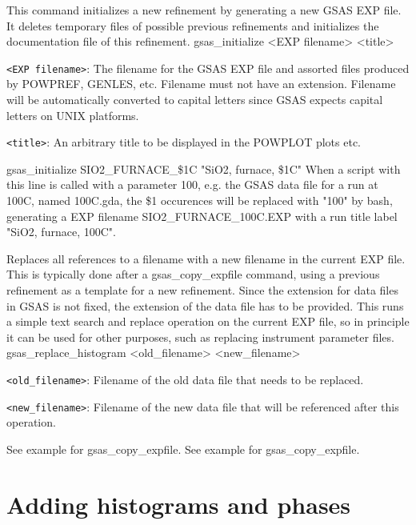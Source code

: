 {
This command initializes a new refinement by generating a new GSAS EXP file. It deletes temporary files of possible previous refinements and initializes the documentation file of this refinement.
}{
gsas\_initialize <EXP filename> <title>
}{
\item \texttt{<EXP filename>}: The filename for the GSAS EXP file and assorted files produced by POWPREF, GENLES, etc. Filename must not have an extension. Filename will be automatically converted to capital letters since GSAS expects capital letters on UNIX platforms.
\item \texttt{<title>}: An arbitrary title to be displayed in the POWPLOT plots etc.
}{
gsas\_initialize SIO2\_FURNACE\_\$1C "SiO2, furnace, \$1C"
}{
When a script with this line is called with a parameter 100, e.g. the GSAS data file for a run at  100C, 
named 100C.gda, the \$1 occurences will be replaced with "100" by bash, generating a EXP filename 
SIO2\_FURNACE\_100C.EXP with a run title label "SiO2, furnace, 100C".
}

{
Replaces all references to a filename with a new filename in the current EXP file. This is typically done after a gsas\_copy\_expfile command, using a previous refinement as a template for a new refinement. Since the extension for data files in GSAS is not fixed, the extension of the data file has to be provided. This runs a simple text search and replace operation on the current EXP file, so in principle it can be used for other purposes, such as replacing instrument parameter files. 
}{
gsas\_replace\_histogram <old\_filename> <new\_filename>
}{
\item \texttt{<old\_filename>}: Filename of the old data file that needs to be replaced.
\item \texttt{<new\_filename>}: Filename of the new data file that will be referenced after this operation.
}{
See example for gsas\_copy\_expfile.
}{
See example for gsas\_copy\_expfile.
}

\section{Adding histograms and phases}

